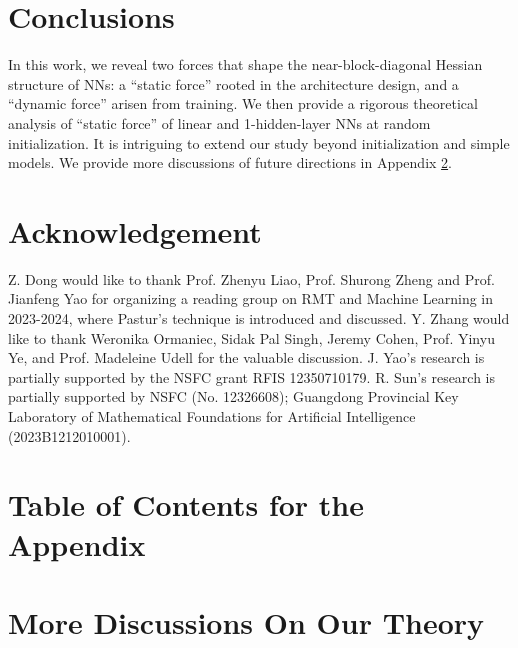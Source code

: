 \documentclass{article}
\newcommand{\1}{^{(1)}}
\newcommand{\2}{^{(2)}}
\begin{document}
\section{Conclusions}

In this work, we reveal two forces that
shape the near-block-diagonal Hessian structure of NNs: a “static force” rooted in the architecture design, and a “dynamic force” arisen
from training. We then provide a rigorous theoretical analysis of “static force” of linear and 1-hidden-layer NNs at random initialization. It is intriguing to extend our study beyond initialization and simple models. We provide more discussions of future directions in Appendix \ref{appendix_discussion}.



\clearpage
\section*{Acknowledgement}
Z. Dong would like to thank Prof. Zhenyu Liao, Prof. Shurong Zheng and Prof. Jianfeng Yao for organizing a reading group on RMT and Machine Learning in 2023-2024, where Pastur's technique is introduced and discussed. Y. Zhang would like to thank  Weronika Ormaniec, Sidak Pal Singh, Jeremy Cohen, Prof. Yinyu Ye, and Prof. Madeleine Udell for the valuable discussion.  J. Yao’s research is partially supported by the NSFC grant RFIS 12350710179. R. Sun’s research is partially supported by NSFC (No. 12326608); Guangdong Provincial Key Laboratory of Mathematical Foundations for Artificial Intelligence (2023B1212010001).





\appendix




\section*{Table of Contents for the Appendix}

\startcontents[sections]










\section{More Discussions On Our Theory}
\label{appendix_discussion}
\end{document}
